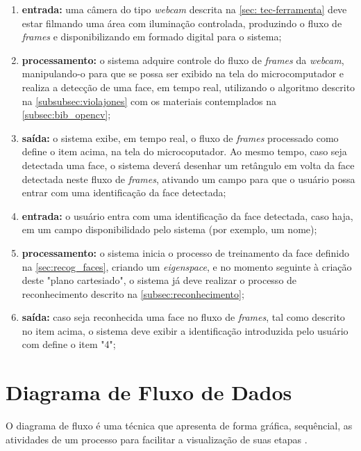\begin{enumerate}
	\item \textbf{entrada:} uma câmera do tipo \textit{webcam} descrita na \autoref{sec: tec-ferramenta} deve estar filmando uma área com iluminação controlada, produzindo o fluxo de \textit{frames} e disponibilizando em formado digital para o sistema;
	
	\item \textbf{processamento:} o sistema adquire controle do fluxo de \textit{frames} da \textit{webcam}, manipulando-o para que se possa ser exibido na tela do microcomputador e realiza a detecção de uma face, em tempo real, utilizando o algoritmo descrito na \autoref{subsubsec:violajones} com os materiais contemplados na \autoref{subsec:bib_opencv};
	
	\item \textbf{saída:} o sistema exibe, em tempo real, o fluxo de \textit{frames} processado como define o item acima, na tela do microcoputador. Ao mesmo tempo, caso seja detectada uma face, o sistema deverá desenhar um retângulo em volta da face detectada neste fluxo de \textit{frames}, ativando um campo para que o usuário possa entrar com uma identificação da face detectada;
	
	\item \textbf{entrada:} o usuário entra com uma identificação da face detectada, caso haja, em um campo disponibilidado pelo sistema (por exemplo, um nome);
	
	\item \textbf{processamento:} o sistema inicia o processo de treinamento da face definido na \autoref{sec:recog_faces}, criando um \textit{eigenspace}, e no momento seguinte à criação deste "plano cartesiado", o sistema já deve realizar o processo de reconhecimento descrito na \autoref{subsec:reconhecimento};
	
	\item \textbf{saída:} caso seja reconhecida uma face no fluxo de \textit{frames}, tal como descrito no item acima, o sistema deve exibir a identificação introduzida pelo usuário com define o item "4";
\end{enumerate}



\section{Diagrama de Fluxo de Dados}\label{sec:fluxorec}

O diagrama de fluxo é uma técnica que apresenta de forma gráfica, sequêncial, as atividades de um processo para facilitar a visualização de suas etapas \cite{fluxogramalivro}.

